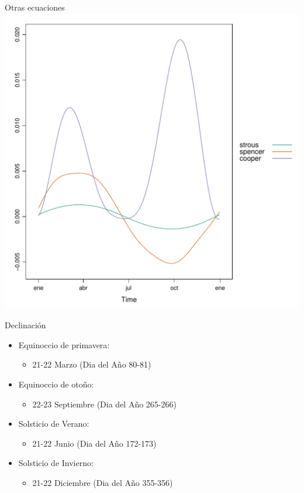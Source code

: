\documentclass[xcolor={usenames,svgnames,dvipsnames}]{beamer}
\begin{document}
\begin{frame}[label=sec-1-1-6]{Otras ecuaciones}
\includegraphics[width=.9\linewidth]{../figs/DeclinacionDiferencias.pdf}
\end{frame}

\begin{frame}[label=sec-1-1-7]{Declinación}
\begin{itemize}
\item \alert{Equinoccio de primavera}:

\begin{itemize}
\item 21-22 Marzo (Dia del Año 80-81)
\end{itemize}

\item \alert{Equinoccio de otoño:}

\begin{itemize}
\item 22-23 Septiembre (Dia del Año 265-266)
\end{itemize}

\item \alert{Solsticio de Verano}:

\begin{itemize}
\item 21-22 Junio (Dia del Año 172-173)
\end{itemize}

\item \alert{Solsticio de Invierno:}

\begin{itemize}
\item 21-22 Diciembre (Dia del Año 355-356)
\end{itemize}
\end{itemize}
\end{frame}
\end{document}
